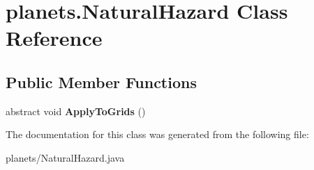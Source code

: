 \hypertarget{classplanets_1_1_natural_hazard}{}\section{planets.\+Natural\+Hazard Class Reference}
\label{classplanets_1_1_natural_hazard}
\subsection*{Public Member Functions}
\begin{DoxyCompactItemize}
\item 
abstract void {\bfseries Apply\+To\+Grids} ()\hypertarget{classplanets_1_1_natural_hazard_a70c482750afc1de03fda784f5eb9df39}{}\label{classplanets_1_1_natural_hazard_a70c482750afc1de03fda784f5eb9df39}

\end{DoxyCompactItemize}


The documentation for this class was generated from the following file\+:\begin{DoxyCompactItemize}
\item 
planets/Natural\+Hazard.\+java\end{DoxyCompactItemize}

